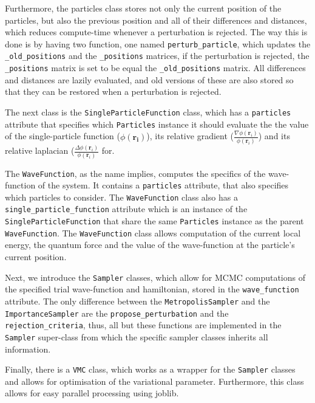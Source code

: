 \documentclass[11pt,a4paper]{article}
\numberwithin{equation}{section}
\begin{document}
Furthermore, the particles class stores not only the current position of the particles, but also the previous position and all of their differences and distances, which reduces compute-time whenever a perturbation is rejected. The way this is done is by having two function, one named \texttt{perturb\_particle}, which updates the \texttt{\_old\_positions} and the \texttt{\_positions} matrices, if the perturbation is rejected, the \texttt{\_positions} matrix is set to be equal the \texttt{\_old\_positions} matrix. All differences and distances are lazily evaluated, and old versions of these are also stored so that they can be restored when a perturbation is rejected.

The next class is the \texttt{SingleParticleFunction} class, which has a \texttt{particles} attribute that specifies which \texttt{Particles} instance it should evaluate the the value of the single-particle function ($\phi(\bm{r_i})$), its relative gradient ($\frac{\nabla \phi(\bm{r}_i)}{\phi(\bm{r}_i)}$) and its relative laplacian ($\frac{\Delta \phi(\bm{r}_i)}{\phi(\bm{r}_i)}$ for.

The \texttt{WaveFunction}, as the name implies, computes the specifics of the wave-function of the system. It contains a \texttt{particles} attribute, that also specifies which particles to consider. The \texttt{WaveFunction} class also has a \texttt{single\_particle\_function} attribute which is an instance of the \texttt{SingleParticleFunction} that share the same \texttt{Particles} instance as the parent \texttt{WaveFunction}. The \texttt{WaveFunction} class allows computation of the current local energy, the quantum force and the value of the wave-function at the particle's current position.

Next, we introduce the \texttt{Sampler} classes, which allow for MCMC computations of the specified trial wave-function and hamiltonian, stored in the \texttt{wave\_function} attribute. The only difference between the \texttt{MetropolisSampler} and the \texttt{ImportanceSampler} are the \texttt{propose\_perturbation} and the \texttt{rejection\_criteria}, thus, all but these functions are implemented in the \texttt{Sampler} super-class from which the specific sampler classes inherits all information.

Finally, there is a \texttt{VMC} class, which works as a wrapper for the \texttt{Sampler} classes and allows for optimisation of the variational parameter. Furthermore, this class allows for easy parallel processing using joblib.
\end{document}
